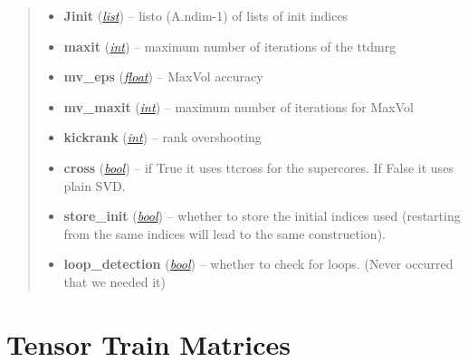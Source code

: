 \documentclass[a4paper,10pt,english]{sphinxmanual}
\begin{document}
\begin{fulllineitems}
\begin{fulllineitems}
\begin{quote}
\begin{description}
\begin{itemize}
\item {} 
\textbf{Jinit} (\href{http://docs.python.org/library/functions.html\#list}{\emph{list}}) -- listo (A.ndim-1) of lists of init indices

\item {} 
\textbf{maxit} (\href{http://docs.python.org/library/functions.html\#int}{\emph{int}}) -- maximum number of iterations of the ttdmrg

\item {} 
\textbf{mv\_eps} (\href{http://docs.python.org/library/functions.html\#float}{\emph{float}}) -- MaxVol accuracy

\item {} 
\textbf{mv\_maxit} (\href{http://docs.python.org/library/functions.html\#int}{\emph{int}}) -- maximum number of iterations for MaxVol

\item {} 
\textbf{kickrank} (\href{http://docs.python.org/library/functions.html\#int}{\emph{int}}) -- rank overshooting

\item {} 
\textbf{cross} (\href{http://docs.python.org/library/functions.html\#bool}{\emph{bool}}) -- if True it uses ttcross for the supercores. If False it uses plain SVD.

\item {} 
\textbf{store\_init} (\href{http://docs.python.org/library/functions.html\#bool}{\emph{bool}}) -- whether to store the initial indices used (restarting from the same indices will lead to the same construction).

\item {} 
\textbf{loop\_detection} (\href{http://docs.python.org/library/functions.html\#bool}{\emph{bool}}) -- whether to check for loops. (Never occurred that we needed it)

\end{itemize}

\end{description}\end{quote}

\end{fulllineitems}


\end{fulllineitems}



\section{Tensor Train Matrices}
\label{api-ttmat:tensor-train-matrices}\label{api-ttmat::doc}\label{api-ttmat:module-TensorToolbox}
\end{document}
